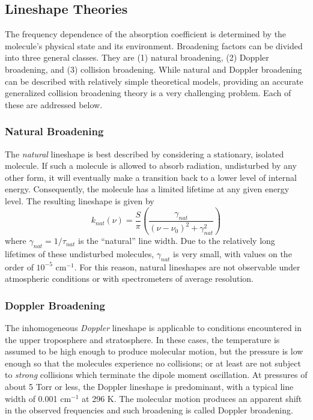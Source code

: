 \documentclass[11pt]{article}
\begin{document}
\subsection{Lineshape Theories}\label{sec:shapetheory}

The frequency dependence of the absorption coefficient is determined by the 
molecule's physical state and its environment.  Broadening factors can be 
divided into three general classes.  They are (1) natural broadening,
(2) Doppler broadening, and (3) collision broadening.  While natural and 
Doppler broadening can be described with relatively simple theoretical
models, providing an accurate generalized collision broadening theory is a 
very challenging problem.  Each of these are addressed below.

\subsubsection{Natural Broadening}\label{sec:natural}

The {\it natural} lineshape is best described by considering a stationary,
isolated molecule. If such a molecule is allowed to absorb radiation,
undisturbed by any other form, it will eventually make a transition back 
to a lower level of internal energy.  Consequently, the molecule has a 
limited lifetime at any given energy level.  The resulting lineshape is 
given by
\begin{equation}
 k_{nat}(\nu)=\frac{S}{\pi}\left(\frac{\gamma_{nat}}
{(\nu-\nu_{0})^{2}+\gamma_{nat}^{2}}\right)
\end{equation}
where $\gamma_{nat}=1/\tau_{nat}$ is the ``natural'' line width.  Due to
the relatively long lifetimes of these undisturbed molecules, 
$\gamma_{nat}$ is very small, with values on the order of
$10^{-5}$ cm$^{-1}$.  For this reason, natural lineshapes are not 
observable 
under atmospheric conditions or with spectrometers of average resolution.

\subsubsection{Doppler Broadening}\label{sec:doppler}

The inhomogeneous {\it Doppler} lineshape is applicable to conditions 
encountered in 
the upper troposphere and stratosphere.  In these cases, the temperature is 
assumed to be high enough to produce molecular motion, but the pressure is 
low enough so that the molecules experience no collisions; or at least are 
not subject to {\it strong} collisions which terminate the dipole moment 
oscillation.
At pressures of about 5 Torr or less, the Doppler lineshape 
is predominant, with a typical line width of 0.001 cm$^{-1}$ at 296 K. 
The molecular motion produces an apparent shift in the observed frequencies
and such broadening is called Doppler broadening.
\end{document}
